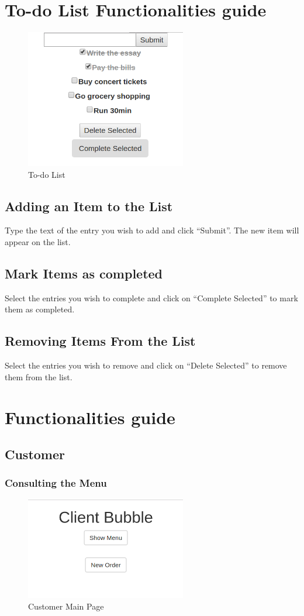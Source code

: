 \section{To-do List Functionalities guide}
\begin{figure}[H]
	\centering
	\includegraphics[width=7cm]{../../documenti/UserManualDemo/demo_screens/todo.png}
	\caption{To-do List}
\end{figure}
\subsection{Adding an Item to the List}
Type the text of the entry you wish to add and click ``Submit''. The new item will appear on the list.
\subsection{Mark Items as completed}
Select the entries you wish to complete and click on ``Complete Selected'' to mark them as completed. 
\subsection{Removing Items From the List}
Select the entries you wish to remove and click on ``Delete Selected'' to remove them from the list.

\section{\DemoName{} Functionalities guide}
\subsection{Customer}
\subsubsection{Consulting the Menu}
\begin{figure}[H]
	\centering
	\includegraphics[width=7cm]{../../documenti/UserManualDemo/demo_screens/client_main.png}
	\caption{Customer Main Page}
\end{figure}
